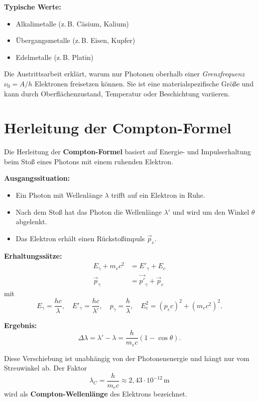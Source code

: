 \textbf{Typische Werte:}
\begin{itemize}
	\item Alkalimetalle (z.\,B. Cäsium, Kalium)
	\item Übergangsmetalle (z.\,B. Eisen, Kupfer)
	\item Edelmetalle (z.\,B. Platin)
\end{itemize}

Die Austrittsarbeit erklärt, warum nur Photonen oberhalb einer \emph{Grenzfrequenz} \( \nu_0 = A/h \) Elektronen freisetzen können. 
Sie ist eine materialspezifische Größe und kann durch Oberflächenzustand, Temperatur oder Beschichtung variieren.

\section{Herleitung der Compton-Formel}
\label{anhangA:comptonHerleitung}

Die Herleitung der \textbf{Compton-Formel} basiert auf Energie- und Impulserhaltung beim Stoß eines Photons mit einem ruhenden Elektron. 

\textbf{Ausgangssituation:}
\begin{itemize}
	\item Ein Photon mit Wellenlänge \( \lambda \) trifft auf ein Elektron in Ruhe.
	\item Nach dem Stoß hat das Photon die Wellenlänge \( \lambda' \) und wird um den Winkel \( \theta \) abgelenkt.
	\item Das Elektron erhält einen Rückstoßimpuls \( \vec{p}_e \).
\end{itemize}

\textbf{Erhaltungssätze:}
\begin{align*}
	E_\gamma + m_e c^2 &= E'_\gamma + E_e \\
	\vec{p}_\gamma &= \vec{p'}_\gamma + \vec{p}_e
\end{align*}
mit
\[
E_\gamma = \frac{hc}{\lambda}, \quad 
E'_\gamma = \frac{hc}{\lambda'}, \quad 
p_\gamma = \frac{h}{\lambda}, \quad 
E_e^2 = (p_e c)^2 + (m_e c^2)^2.
\]

\textbf{Ergebnis:}
\[
\Delta \lambda = \lambda' - \lambda 
= \frac{h}{m_e c}(1 - \cos \theta).
\]

Diese Verschiebung ist unabhängig von der Photonenenergie und hängt nur vom Streuwinkel ab. Der Faktor
\[
\lambda_C = \frac{h}{m_e c} \approx 2{,}43 \cdot 10^{-12}\,\mathrm{m}
\]
wird als \textbf{Compton-Wellenlänge} des Elektrons bezeichnet.

